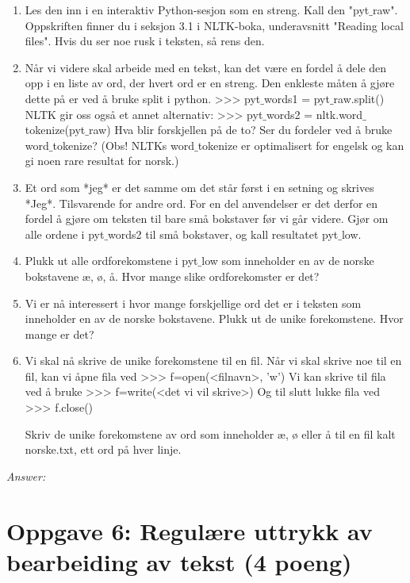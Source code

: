 \documentclass[a4paper, 12pt,]{article}             %
\begin{document}
\begin{enumerate}
\item  Les den inn i en interaktiv Python-sesjon som en streng. Kall den "pyt$\_$raw". Oppskriften finner du i 
seksjon 3.1 i NLTK-boka, underavsnitt "Reading local files". Hvis du ser noe rusk i teksten, så rens den. 
\item Når vi videre skal arbeide med en tekst, kan det være en fordel å dele den opp i en liste av ord, der 
hvert ord er en streng. Den enkleste måten å gjøre dette på er ved å bruke split i python. 
>>> pyt$\_$words1 = pyt$\_$raw.split() 
NLTK gir oss også et annet alternativ: 
>>> pyt$\_$words2 = nltk.word$\_$tokenize(pyt$\_$raw) 
Hva blir forskjellen på de to? Ser du fordeler ved å bruke word$\_$tokenize? (Obs! NLTKs word$\_$tokenize 
er optimalisert for engelsk og kan gi noen rare resultat for norsk.) 
\item Et ord som *jeg* er det samme om det står først i en setning og skrives *Jeg*. Tilsvarende for andre 
ord. For en del anvendelser er det derfor en fordel å gjøre om teksten til bare små bokstaver før vi 
går videre. Gjør om alle ordene i pyt$\_$words2 til små bokstaver, og kall resultatet pyt$\_$low. 
\item Plukk ut alle ordforekomstene i pyt$\_$low som inneholder en av de norske bokstavene æ, ø, å. Hvor 
mange slike ordforekomster er det? 
\item  Vi er nå interessert i hvor mange forskjellige ord det er i teksten som inneholder en av de norske 
bokstavene. Plukk ut de unike forekomstene. Hvor mange er det? 
\item Vi skal nå skrive de unike forekomstene til en fil. Når vi skal skrive noe til en fil, kan vi åpne fila ved 
>>> f=open(<filnavn>, 'w') 
Vi kan skrive til fila ved å bruke 
>>> f=write(<det vi vil skrive>) 
Og til slutt lukke fila ved  
>>> f.close() 
 
Skriv de unike forekomstene av ord som inneholder æ, ø eller å til en fil kalt norske.txt, ett ord på 
hver linje.
\end{enumerate}

\textit{Answer:}

\section*{Oppgave 6: Regulære uttrykk av bearbeiding av tekst (4 poeng)}
\end{document}
